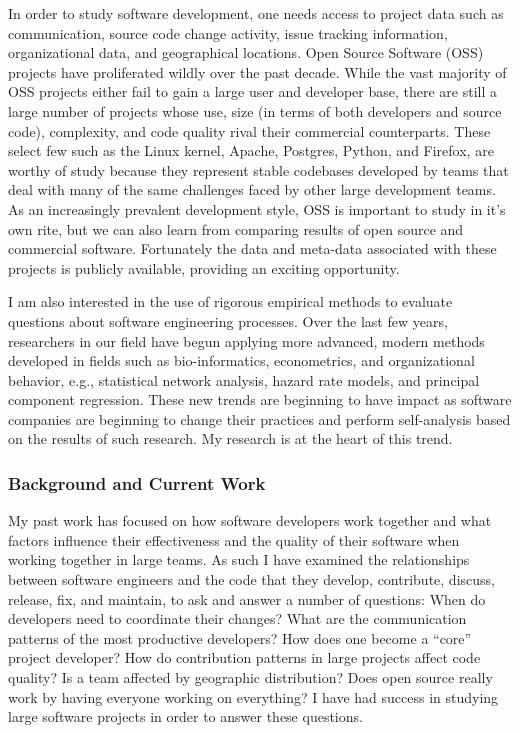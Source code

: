 \documentclass[10pt]{article}
\newcommand\Section[1]{\subsubsection*{\large #1}}
\begin{document}
\begin{small}
In order to study software development, one needs access to project data such
as communication, source code change activity, issue tracking information,
organizational data, and geographical locations.  Open Source Software (OSS)
projects have proliferated wildly over the past decade.  While the vast
majority of OSS projects either fail to gain a large user and developer base,
there are still a large number of projects whose use, size (in terms of both
developers and source code), complexity, and code quality rival their
commercial counterparts.  These select few such as the Linux kernel, Apache,
Postgres, Python, and Firefox, are worthy of study because they represent
stable codebases developed by teams that deal with many of the same challenges
faced by other large development teams.  As an increasingly prevalent
development style, OSS is important to study in it's own rite, but we can also
learn from comparing results of open source and commercial software.
Fortunately the data and meta-data associated with these projects is publicly
available, providing an exciting opportunity.

I am also interested in the use of rigorous empirical methods to evaluate
questions about software engineering processes.  Over the last few years,
researchers in our field have begun applying more advanced, modern methods
developed in fields such as bio-informatics, econometrics, and organizational
behavior, e.g., statistical network analysis, hazard rate models, and principal
component regression.  These new trends are beginning to have impact as
software companies are beginning to change their practices and perform
self-analysis based on the results of such research.  My research is at the
heart of this trend.

\Section{Background and Current Work}

My past work has focused on how software developers work together and what factors influence their
effectiveness and the quality of their software when working together in large teams.  As such
I have examined the relationships between software engineers and the code that they develop, contribute, discuss,
release, fix, and maintain, to ask and answer a number of questions:
When do developers need to coordinate their changes?  What are the communication
patterns of the most productive developers?  How does one become a ``core'' project developer?
How do contribution patterns in large projects affect code quality? Is a team affected by
geographic distribution? Does open source really work by having everyone working on 
everything?  I have had success in studying large software projects in order to 
answer these questions.


\end{small}
\end{document}
